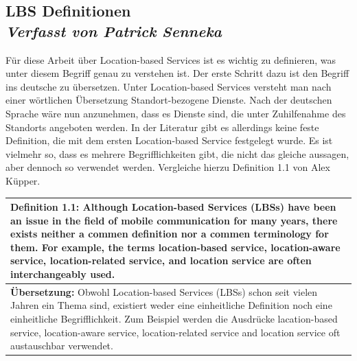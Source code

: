 \subsection[LBS Definitionen]{LBS Definitionen
 \\ \textnormal{\small{\textit {Verfasst von Patrick Senneka}}}}





Für diese Arbeit über Location-based Services ist es wichtig zu definieren, was unter diesem Begriff genau zu verstehen ist. Der erste Schritt dazu ist den Begriff ins deutsche zu übersetzen. Unter Location-based Services versteht man nach einer wörtlichen Übersetzung Standort-bezogene Dienste. Nach der deutschen Sprache wäre nun anzunehmen, dass es Dienste sind, die unter Zuhilfenahme des Standorts angeboten werden. In der Literatur gibt es allerdings keine feste Definition, die mit dem ersten Location-based Service festgelegt wurde. Es ist vielmehr so, dass es mehrere Begrifflichkeiten gibt, die nicht das gleiche aussagen, aber dennoch so verwendet werden. Vergleiche hierzu Definition 1.1 von Alex Küpper.

\begin{table}[h]
	\centering
	\begin{tabular}{|p{16cm}|}\hline
		\textbf{Definition 1.1:} \glqq Although Location-based Services (LBSs) have been an issue in the field of mobile communication for many years, there exists neither a commen definition nor a commen terminology for them. For example, the terms location-based service, location-aware service, location-related service, and location service are often interchangeably used. \grqq \cite[S.1]{Kuepper2005} \\ \hline
		\textbf{Übersetzung:} Obwohl Location-based Services (LBSs) schon seit vielen Jahren ein Thema sind, existiert weder eine einheitliche Definition noch eine einheitliche Begrifflichkeit. Zum Beispiel werden die Ausdrücke lacation-based service, location-aware service, location-related service and location service oft austauschbar verwendet. \\ \hline
	\end{tabular}
\end{table}


